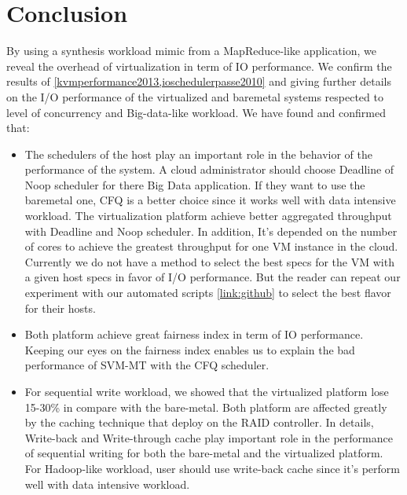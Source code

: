 \documentclass{acmsig}
\begin{document}
\section{Conclusion}
By using a synthesis workload mimic from a MapReduce-like application, we reveal the overhead of virtualization in term of IO performance. We confirm the results of \ref{kvmperformance2013,ioschedulerpasse2010} and giving further details on the I/O performance of the virtualized and baremetal systems respected to level of concurrency and Big-data-like workload. We have found and confirmed that:
\begin{itemize}
  \item The schedulers of the host play an important role in the behavior of the performance of the system. A cloud administrator should choose Deadline of Noop scheduler for there Big Data application. If they want to use the baremetal one, CFQ is a better choice since it works well with data intensive workload. The virtualization platform achieve better aggregated throughput with Deadline and Noop scheduler. In addition, It's depended on the number of cores to achieve the greatest throughput for one VM instance in the cloud. Currently we do not have a method to select the best specs for the VM with a given host specs in favor of I/O performance. But the reader can repeat our experiment with our automated scripts \ref{link:github} to select the best flavor for their hosts.
  \item Both platform achieve great fairness index in term of IO performance. Keeping our eyes on the fairness index enables us to explain the bad performance of SVM-MT with the CFQ scheduler.
  \item For sequential write workload, we showed that the virtualized platform lose 15-30\% in compare with the bare-metal. Both platform are affected greatly by the caching technique that deploy on the RAID controller. In details, Write-back and Write-through cache play important role in the performance of sequential writing for both the bare-metal and the virtualized platform. For Hadoop-like workload, user should use write-back cache since it's perform well with data intensive workload.
\end{itemize}
\end{document}
